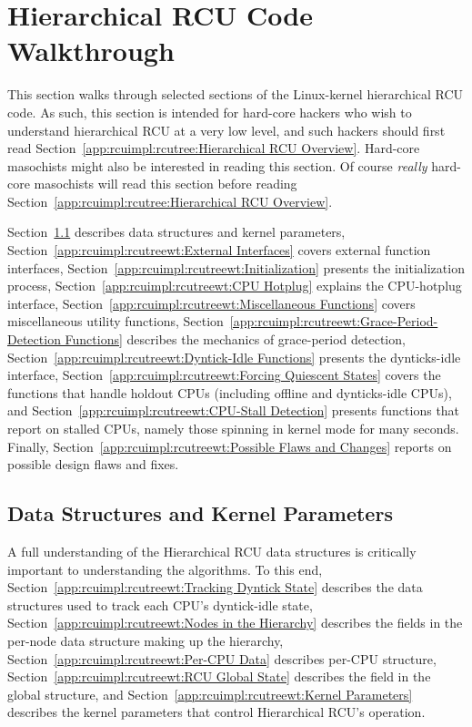 
\section{Hierarchical RCU Code Walkthrough}
\label{app:rcuimpl:rcutreewt:Hierarchical RCU Code Walkthrough}

This section walks through selected sections of the Linux-kernel
hierarchical RCU code.
As such, this section is intended for hard-core hackers who wish
to understand hierarchical RCU at a very low level, and such hackers
should first read
Section~\ref{app:rcuimpl:rcutree:Hierarchical RCU Overview}.
Hard-core masochists might also be interested in reading this section.
Of course \emph{really} hard-core masochists will read this section
before reading
Section~\ref{app:rcuimpl:rcutree:Hierarchical RCU Overview}.

Section~\ref{app:rcuimpl:rcutreewt:Data Structures and Kernel Parameters}
describes data structures and kernel parameters,
Section~\ref{app:rcuimpl:rcutreewt:External Interfaces}
covers external function interfaces,
Section~\ref{app:rcuimpl:rcutreewt:Initialization}
presents the initialization process,
Section~\ref{app:rcuimpl:rcutreewt:CPU Hotplug}
explains the CPU-hotplug interface,
Section~\ref{app:rcuimpl:rcutreewt:Miscellaneous Functions}
covers miscellaneous utility functions,
Section~\ref{app:rcuimpl:rcutreewt:Grace-Period-Detection Functions}
describes the mechanics of grace-period detection,
Section~\ref{app:rcuimpl:rcutreewt:Dyntick-Idle Functions}
presents the dynticks-idle interface,
Section~\ref{app:rcuimpl:rcutreewt:Forcing Quiescent States}
covers the functions that handle holdout CPUs (including offline and
dynticks-idle CPUs), and
Section~\ref{app:rcuimpl:rcutreewt:CPU-Stall Detection}
presents functions that report on stalled CPUs, namely those spinning
in kernel mode for many seconds.
Finally,
Section~\ref{app:rcuimpl:rcutreewt:Possible Flaws and Changes}
reports on possible design flaws and fixes.

\subsection{Data Structures and Kernel Parameters}
\label{app:rcuimpl:rcutreewt:Data Structures and Kernel Parameters}

A full understanding of the Hierarchical RCU data structures is
critically important to understanding the algorithms.
To this end,
Section~\ref{app:rcuimpl:rcutreewt:Tracking Dyntick State}
describes the data structures used to track each CPU's dyntick-idle state,
Section~\ref{app:rcuimpl:rcutreewt:Nodes in the Hierarchy}
describes the fields in the per-node data structure making up the
 hierarchy,
Section~\ref{app:rcuimpl:rcutreewt:Per-CPU Data}
describes per-CPU  structure,
Section~\ref{app:rcuimpl:rcutreewt:RCU Global State}
describes the field in the global  structure,
and
Section~\ref{app:rcuimpl:rcutreewt:Kernel Parameters}
describes the kernel parameters that control Hierarchical RCU's
operation.

